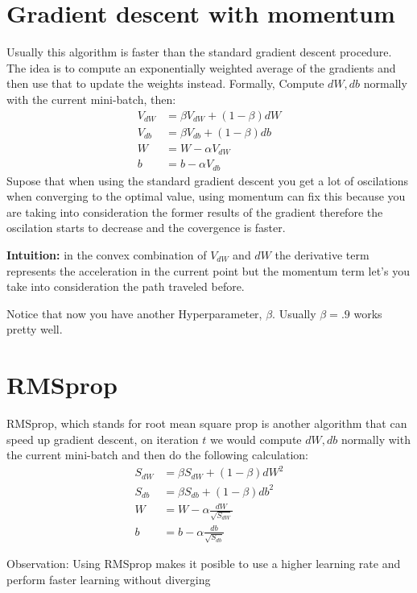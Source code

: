 \section*{Gradient descent with momentum}

Usually this algorithm is faster than the standard gradient descent procedure. The idea
is to compute an exponentially weighted average of the gradients and then use that
to update the weights instead. Formally, Compute $dW, db$ normally with the current 
mini-batch, then:
\begin{align*}
    V_{dW} &= \beta V_{dW} + (1 - \beta)dW \\
    V_{db} &= \beta V_{db} + (1 - \beta)db \\
    W &= W - \alpha V_{dW} \\
    b &= b - \alpha V_{db}
\end{align*}
Supose that when using the standard gradient descent you get a lot of oscilations 
when converging to the optimal value, using momentum can fix this because you are taking
into consideration the former results of the gradient therefore the oscilation starts
to decrease and the covergence is faster.

\textbf{Intuition:} in the convex combination of $V_{dW}$ and $dW$ the derivative term
represents the acceleration in the current point but the momentum term let's you take
into consideration the path traveled before.

Notice that now you have another Hyperparameter, $\beta$. Usually $\beta = .9$ works 
pretty well.

\section*{RMSprop}

RMSprop, which stands for root mean square prop is another algorithm that can speed up
gradient descent, on iteration $t$ we would compute $dW, db$ normally with the current 
mini-batch and then do the following calculation:
\begin{align*}
    S_{dW} &= \beta S_{dW} + (1 - \beta)dW^2 \\
    S_{db} &= \beta S_{db} + (1 - \beta)db^2 \\
    W &= W - \alpha \frac{dW}{\sqrt{S_{dW}}} \\
    b &= b - \alpha \frac{db}{\sqrt{S_{db}}}
\end{align*}

Observation: Using RMSprop makes it posible to use a higher learning rate and perform
faster learning without diverging

